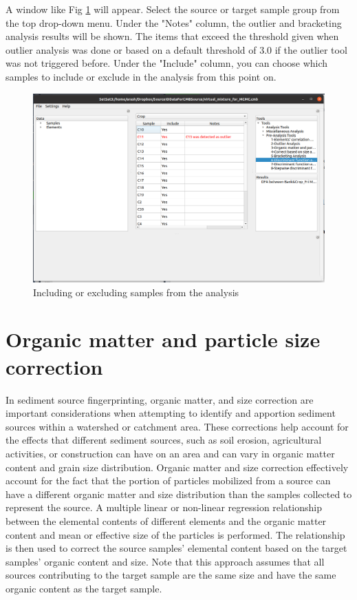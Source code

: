 \documentclass[12pt]{report}
\begin{document}
A window like Fig \ref{fig:include_exclude_samples} will appear. Select the source or target sample group from the top drop-down menu. Under the "Notes" column, the outlier and bracketing analysis results will be shown. The items that exceed the threshold given when outlier analysis was done or based on a default threshold of 3.0 if the outlier tool was not triggered before. Under the "Include" column, you can choose which samples to include or exclude in the analysis from this point on. 

\begin{figure}[ht]
    \centering
    \includegraphics[width=14cm]{Figures/Include_Exclude_samples.png}
    \caption{Including or excluding samples from the analysis}
    \label{fig:include_exclude_samples}
\end{figure}
\FloatBarrier

\section{Organic matter and particle size correction}\label{sec:sizeandorganiccorrection}
In sediment source fingerprinting, organic matter, and size correction are important considerations when attempting to identify and apportion sediment sources within a watershed or catchment area. These corrections help account for the effects that different sediment sources, such as soil erosion, agricultural activities, or construction can have on an area and can vary in organic matter content and grain size distribution. Organic matter and size correction effectively account for the fact that the portion of particles mobilized from a source can have a different organic matter and size distribution than the samples collected to represent the source. A multiple linear or non-linear regression relationship between the elemental contents of different elements and the organic matter content and mean or effective size of the particles is performed. The relationship is then used to correct the source samples' elemental content based on the target samples' organic content and size. Note that this approach assumes that all sources contributing to the target sample are the same size and have the same organic content as the target sample. 
\end{document}
